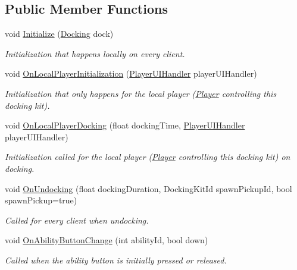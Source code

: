 \subsection*{Public Member Functions}
\begin{DoxyCompactItemize}
\item 
void \hyperlink{class_docking_kit_ada18b95ce1ccac502a31a468381aab7c}{Initialize} (\hyperlink{class_docking}{Docking} dock)
\begin{DoxyCompactList}\small\item\em Initialization that happens locally on every client. \end{DoxyCompactList}\item 
void \hyperlink{class_docking_kit_a1498b50f1fe0b8e54e69c637306c61b6}{On\+Local\+Player\+Initialization} (\hyperlink{class_player_u_i_handler}{Player\+U\+I\+Handler} player\+U\+I\+Handler)
\begin{DoxyCompactList}\small\item\em Initialization that only happens for the local player (\hyperlink{class_player}{Player} controlling this docking kit). \end{DoxyCompactList}\item 
void \hyperlink{class_docking_kit_a30aaa34339d35b52a59af9a871fa0182}{On\+Local\+Player\+Docking} (float docking\+Time, \hyperlink{class_player_u_i_handler}{Player\+U\+I\+Handler} player\+U\+I\+Handler)
\begin{DoxyCompactList}\small\item\em Initialization called for the local player (\hyperlink{class_player}{Player} controlling this docking kit) on docking. \end{DoxyCompactList}\item 
void \hyperlink{class_docking_kit_a7e7c524ffdc103a3ecc5736333641792}{On\+Undocking} (float docking\+Duration, Docking\+Kit\+Id spawn\+Pickup\+Id, bool spawn\+Pickup=true)
\begin{DoxyCompactList}\small\item\em Called for every client when undocking. \end{DoxyCompactList}\item 
void \hyperlink{class_docking_kit_a7768323bf115988fc5465746eddefec6}{On\+Ability\+Button\+Change} (int ability\+Id, bool down)
\begin{DoxyCompactList}\small\item\em Called when the ability button is initially pressed or released. \end{DoxyCompactList}\item 

\end{DoxyCompactItemize}
